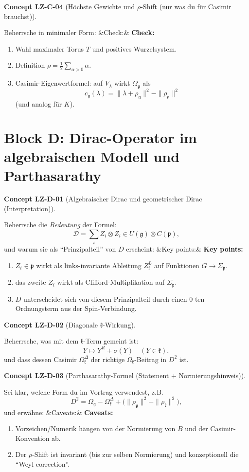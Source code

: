 \documentclass[10pt, letterpaper]{article}
\newenvironment{romanenum}[1][]
  {%
    \ifx&#1&
    \else
      \textbf{#1}\quad
    \fi
    \begin{enumerate}[label=\roman*)]
  }
  {%
    \end{enumerate}%
  }
\newcommand{\CustomHeading}[3]{%
  \par\medskip\noindent%
  \textbf{#1 #2} \textnormal{(#3)}.\enskip%
}
\newenvironment{CONC}[2]{\begin{unitbox}\CustomHeading{Concept}{#1}{#2}}{\end{unitbox}}
\begin{document}
\begin{CONC}{LZ-C-04}{H\"ochste Gewichte und $\rho$-Shift (nur was du f\"ur Casimir brauchst)}
Beherrsche in minimaler Form:
\begin{romanenum}[Check:]
\item Wahl maximaler Torus $T$ und positives Wurzelsystem.
\item Definition $\rho=\frac12\sum_{\alpha>0}\alpha$.
\item Casimir-Eigenwertformel: auf $V_\lambda$ wirkt $\Omega_{\mathfrak g}$ als
\[
c_{\mathfrak g}(\lambda)=\|\lambda+\rho_{\mathfrak g}\|^2-\|\rho_{\mathfrak g}\|^2
\]
(und analog f\"ur $K$).
\end{romanenum}
\end{CONC}

\section{Block D: Dirac-Operator im algebraischen Modell und Parthasarathy}

\begin{CONC}{LZ-D-01}{Algebraischer Dirac und geometrischer Dirac (Interpretation)}
Beherrsche die \emph{Bedeutung} der Formel:
\[
\mathcal D=\sum_i Z_i\otimes Z_i \in U(\mathfrak g)\otimes C(\mathfrak p),
\]
und warum sie als ``Prinzipalteil'' von $D$ erscheint:
\begin{romanenum}[Key points:]
\item $Z_i\in\mathfrak p$ wirkt als links-invariante Ableitung $Z_i^L$ auf Funktionen $G\to \Sigma_{\mathfrak p}$.
\item das zweite $Z_i$ wirkt als Clifford-Multiplikation auf $\Sigma_{\mathfrak p}$.
\item $D$ unterscheidet sich von diesem Prinzipalteil durch einen $0$-ten Ordnungsterm aus der Spin-Verbindung.
\end{romanenum}
\end{CONC}

\begin{CONC}{LZ-D-02}{Diagonale $\mathfrak k$-Wirkung}
Beherrsche, was mit dem $\mathfrak k$-Term gemeint ist:
\[
Y\mapsto Y^R+\sigma(Y)\quad (Y\in\mathfrak k),
\]
und dass dessen Casimir $\Omega_{\mathfrak k}^{\Delta}$ der richtige $\Omega_{\mathfrak k}$-Beitrag in $D^2$ ist.
\end{CONC}

\begin{CONC}{LZ-D-03}{Parthasarathy-Formel (Statement + Normierungshinweis)}
Sei klar, welche Form du im Vortrag verwendest, z.B.
\[
D^2 = \Omega_{\mathfrak g}-\Omega_{\mathfrak k}^{\Delta}+\big(\|\rho_{\mathfrak g}\|^2-\|\rho_{\mathfrak k}\|^2\big),
\]
und erw\"ahne:
\begin{romanenum}[Caveats:]
\item Vorzeichen/Numerik h\"angen von der Normierung von $B$ und der Casimir-Konvention ab.
\item Der $\rho$-Shift ist invariant (bis zur selben Normierung) und konzeptionell die ``Weyl correction''.
\end{romanenum}
\end{CONC}
\end{document}
